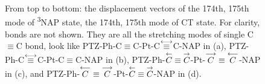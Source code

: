 \begin{figure}[]
\\
\\
\\
\caption{From top to bottom: the displacement vectors of the 174th, 175th mode of \textsuperscript{3}NAP state, the 174th, 175th mode of CT state. For clarity, bonds are not shown. They are all the stretching modes of single C$\equiv$C bond, look like
PTZ-Ph-C$\equiv$C-Pt-C$\protect\overset{\longleftrightarrow}{\equiv}$C-NAP in (a),
PTZ-Ph-C$\protect\overset{\longleftrightarrow}{\equiv}$C-Pt-C$\equiv$C-NAP in (b),
PTZ-Ph-$\protect\overset{\leftarrow}{C}\equiv\protect\overset{\rightarrow}{C}$-Pt-$\protect\overset{\longrightarrow}{C}\equiv\protect\overset{\longleftarrow}{C}$-NAP
 in (c), and
PTZ-Ph-$\protect\overset{\longleftarrow}{C}\equiv\protect\overset{\longrightarrow}{C}$-Pt-$\protect\overset{\leftarrow}{C}\equiv\protect\overset{\rightarrow}{C}$-NAP
 in (d).
}\label{NMT1T3}
\end{figure}



